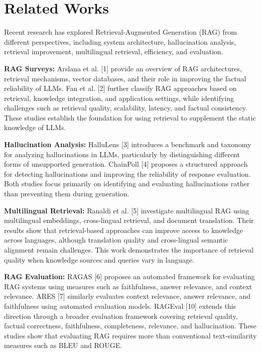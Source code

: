 \documentclass[conference]{IEEEtran}
\begin{document}
\section{Related Works}
Recent research has explored Retrieval-Augmented Generation (RAG) from different perspectives, including system architecture, hallucination analysis, retrieval improvement, multilingual retrieval, efficiency, and evaluation.

\textbf{RAG Surveys:} Arslana et al. [1] provide an overview of RAG architectures, retrieval mechanisms, vector databases, and their role in improving the factual reliability of LLMs. Fan et al. [2] further classify RAG approaches based on retrieval, knowledge integration, and application settings, while identifying challenges such as retrieval quality, scalability, latency, and factual consistency. These studies establish the foundation for using retrieval to supplement the static knowledge of LLMs.

\textbf{Hallucination Analysis:} HalluLens [3] introduces a benchmark and taxonomy for analyzing hallucinations in LLMs, particularly by distinguishing different forms of unsupported generation. ChainPoll [4] proposes a structured approach for detecting hallucinations and improving the reliability of response evaluation. Both studies focus primarily on identifying and evaluating hallucinations rather than preventing them during generation.

\textbf{Multilingual Retrieval:} Ranaldi et al. [5] investigate multilingual RAG using multilingual embeddings, cross-lingual retrieval, and document translation. Their results show that retrieval-based approaches can improve access to knowledge across languages, although translation quality and cross-lingual semantic alignment remain challenges. This work demonstrates the importance of retrieval quality when knowledge sources and queries vary in language.

\textbf{RAG Evaluation:} RAGAS [6] proposes an automated framework for evaluating RAG systems using measures such as faithfulness, answer relevance, and context relevance. ARES [7] similarly evaluates context relevance, answer relevance, and faithfulness using automated evaluation models. RAGEval [10] extends this direction through a broader evaluation framework covering retrieval quality, factual correctness, faithfulness, completeness, relevance, and hallucination. These studies show that evaluating RAG requires more than conventional text-similarity measures such as BLEU and ROUGE.
\end{document}
